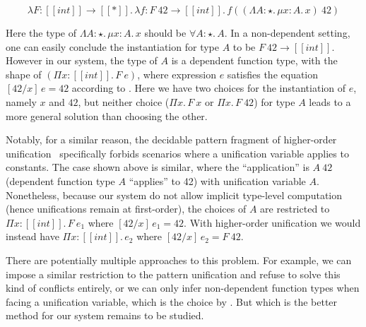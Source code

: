 \begin{equation*}
    \lambda F : [[int]] \rightarrow [[*]].\, \lambda f : F~42 \rightarrow [[int]].\, f ((\Lambda A : \star.\,\mu x : A.\, x)~42)
\end{equation*}

Here the type of $\Lambda A : \star.\,\mu x : A.\, x$ should be $\forall A : \star.\, A$.
In a non-dependent setting, one can easily conclude the instantiation for type $A$ to be
$F~42 \rightarrow [[int]]$. However in our system, the type of $A$ is a
dependent function type, with the shape of $(\Pi x : [[int]].\, F~e)$,
where expression $e$ satisfies the equation $[42/x]\,e = 42$ according to .
Here we have two choices for the instantiation of $e$, namely $x$ and $42$,
but neither choice ($\Pi x.\, F~x$ or $\Pi x.\, F~42$) for type $A$ leads to a more general
solution than choosing the other.

Notably, for a similar reason, the decidable pattern
fragment of higher-order unification~\citep{patternunification} specifically
forbids scenarios where a unification variable applies to constants.
The case shown above is similar, where the ``application'' is $A~42$
(dependent function type $A$ ``applies'' to 42) with unification variable $A$.
Nonetheless, because our system do not allow implicit type-level
computation (hence unifications remain at first-order),
the choices of $A$ are restricted to $\Pi x : [[int]].\,F~e_1$ where $[42/x]\,e_1 = 42$.
With higher-order unification we would instead
have $\Pi x : [[int]].\, e_2$ where $[42/x]\,e_2 = F~42$.

There are potentially multiple approaches to this problem. For example, we can
impose a similar restriction to the pattern unification and refuse to solve
this kind of conflicts entirely, or we can only infer non-dependent function types when
facing a unification variable, which is the choice by \citet{dh}. But which is
the better method for our system remains to be studied.


